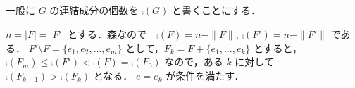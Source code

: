 \subsection{}
一般に $G$ の連結成分の個数を $\comp(G)$ と書くことにする．

$n = |F| = |F'|$ とする．森なので　$\comp(F) = n - \|F\|$, $\comp(F') = n - \|F'\|$ である．
$F'\setminus F = \{e_1,e_2,\ldots, e_m\}$ として，$F_k = F + \{e_1,\ldots,e_k\}$ とすると，
$\comp(F_m) \leq \comp(F') < \comp(F) = \comp(F_0)$ なので，ある $k$ に対して $\comp(F_{k-1}) > \comp(F_k)$ となる．
$e = e_k$ が条件を満たす．